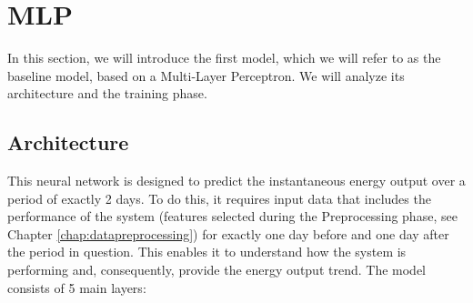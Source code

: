 \section{MLP}\label{sec:mlpbaseline}
In this section, we will introduce the first model, which we will refer to as the
baseline model, based on a Multi-Layer Perceptron.
We will analyze its architecture and the training phase.


\subsection{Architecture}
This neural network is designed to predict the instantaneous energy output over
a period of exactly 2 days.
To do this, it requires input data that includes the performance of the system
(features selected during the Preprocessing phase, see Chapter \ref{chap:datapreprocessing}) for exactly one day
before and one day after the period in question.
This enables it to understand how the system is performing and,
consequently, provide the energy output trend.
The model consists of 5 main layers:


